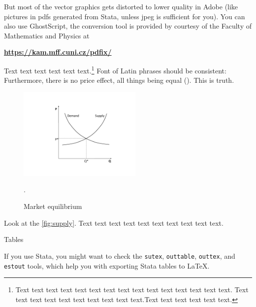 But most of the vector graphics gets distorted to lower quality in Adobe (like pictures in pdfs generated from Stata, unless jpeg is sufficient for you).
You can also use GhostScript, the conversion tool is provided by courtesy of the Faculty of Mathematics and Physics at

\vspace{0.5cm}
\textbf{\href{https://kam.mff.cuni.cz/pdfix/}{https://kam.mff.cuni.cz/pdfix/}}
\vspace{0.5cm}

Text text text text text text.\footnote{Text text text text text text text text text text text text text text text. Text text text text text text text text text text.Text text text text text text.}
Font of Latin phrases should be consistent: Furthermore, there is no  price effect, all things being equal (). This is  truth.

\begin{figure}[!htbp]
\begin{center}
\caption{Market equilibrium}
\label{fig:supply}
\includegraphics[width=60mm]{Figures/supplydemand}
\end{center}\vspace{-0.5cm}
\begin{source}\cite{Haufler2006}.\end{source}
\end{figure}

Look at the \autoref{fig:supply}. Text text text text text text text text text text.



Tables

If you use Stata, you might want to check the \texttt{sutex}, \texttt{outtable}, \texttt{outtex}, and \texttt{estout} tools, which help you with exporting Stata tables to \LaTeX{}.

